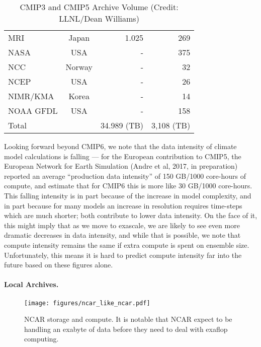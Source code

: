 \begin{table}[htb]
\begin{tabular}{  l | c | r | r  }
		MRI              & Japan               & 1.025              & 269              \\
		NASA             & USA                 &  -                 & 375              \\
		NCC              & Norway              &   -                & 32               \\
		NCEP             & USA                 &   -                & 26                \\
		NIMR/KMA         & Korea               &   -                & 14               \\
		NOAA GFDL        & USA                 &   -                & 158              \\  \hline\hline
		Total            &                     & 34.989 (TB)       & 3,108 (TB)        \\
	\end{tabular}
	\caption{CMIP3 and CMIP5  Archive Volume (Credit: LLNL/Dean Williams)}
	\label{tab:CMIP_data_volume}
\end{table}

Looking forward beyond CMIP6, we note that the data intensity of climate model calculations is falling --- for the European contribution to CMIP5, the European Network for Earth Simulation (Andre et al, 2017, in preparation) reported an average ``production data intensity'' of 150 GB/1000 core-hours of compute, and estimate that for CMIP6 this is more like 30 GB/1000 core-hours. This falling intensity is in part because of the increase in model complexity, and in part because for many models an increase in resolution requires time-steps which are much shorter; both contribute to lower data intensity.  On the face of it, this might imply that as we move to exascale, we are likely to see even more dramatic decreases in data intensity, and while that is possible, we note that compute intensity remains the same if extra compute is spent on ensemble size. Unfortunately, this means it is hard to predict compute intensity far into the future based on these figures alone.

\paragraph{Local Archives.}
\label{sec:archive_intensity}

\begin{figure}
\centering
	\texttt{[image: figures/ncar\_like\_ncar.pdf]}
	\caption{NCAR storage and compute. It is notable that NCAR expect to be handling an exabyte of data before they need to deal with exaflop computing.}
	\label{fig:ncar archive}\end{figure}

